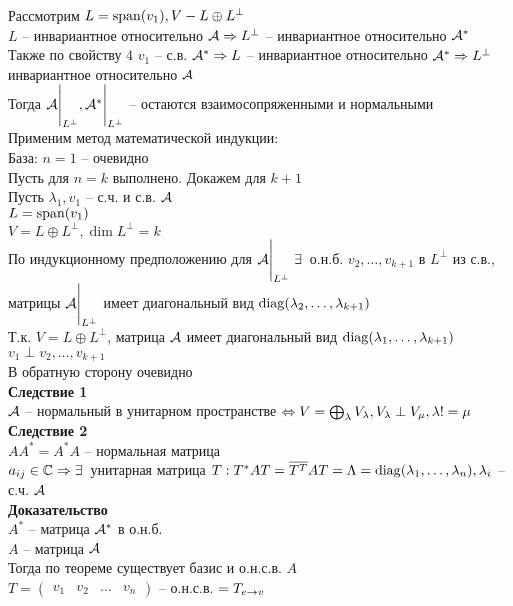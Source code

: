 \documentclass[12pt]{article}
\begin{document}
Рассмотрим $L = \operatorname{span}(v_1), V - L \oplus L^\perp$\\
$L$ -- инвариантное относительно $\mathcal{A} \Rightarrow L^\perp$ -- инвариантное относительно $\mathcal{A}^*$\\
Также по свойству 4 $v_1$ -- с.в. $\mathcal{A}^* \Rightarrow L$ -- инвариантное относительно $\mathcal{A}^* \Rightarrow L^\perp$ инвариантное относительно $\mathcal{A}$\\
Тогда $\mathcal{A} \Biggr|_{L^\perp}, \mathcal{A}^* \Biggr|_{L^\perp}$ -- остаются взаимосопряженными и нормальными\\
Применим метод математической индукции:\\
База: $n = 1$ -- очевидно\\
Пусть для $n = k$ выполнено. Докажем для $k+1$\\
Пусть $ \lambda_1, v_1$ -- с.ч. и с.в. $\mathcal{A}$\\
$L = \operatorname{span}(v_1)$\\
$V = L \oplus L^\perp, \dim L^\perp = k$\\
По индукционному предположению для $\mathcal{A}\Biggr|_{L^\perp}\ \exists\,$ о.н.б. $v_2, \ldots, v_{k+1}$ в $L^\perp$ из с.в., матрицы $\mathcal{A}\Biggr|_{L^\perp}$ имеет диагональный вид $\operatorname{diag}( \lambda_2, \ldots, \lambda_{k+1})$\\
Т.к. $V = L\oplus L^\perp$, матрица $\mathcal{A}$ имеет диагональный вид $\operatorname{diag}( \lambda_1, \ldots, \lambda_{k+1})$\\
$v_1 \perp v_2, \ldots, v_{k+1}$\\
В обратную сторону очевидно\\
\textbf{Следствие 1}\\
$\mathcal{A}$ -- нормальный в унитарном пространстве $\Leftrightarrow V = \bigoplus_{ \lambda}V_\lambda, V_\lambda \perp V_\mu, \lambda != \mu$\\
\textbf{Следствие 2}\\
$AA^* = A^*A$ -- нормальная матрица\\
$a_{ij} \in \mathbb{C} \Rightarrow \exists\,$ унитарная матрица $T: T^*AT = \overline{T^T}AT = \Lambda = \operatorname{diag}( \lambda_1, \ldots, \lambda_n), \lambda_i$ -- с.ч. $\mathcal{A}$\\
\textbf{Доказательство}\\
$A^*$ -- матрица $\mathcal{A}^*$ в о.н.б.\\
$A$ -- матрица $\mathcal{A}$\\
Тогда по теореме существует базис и о.н.с.в. $A$\\
$T = \begin{pmatrix}
    v_1 & v_2 & \ldots & v_n
\end{pmatrix}$ -- о.н.с.в. $= T_{e\rightarrow v}$\\
\end{document}
